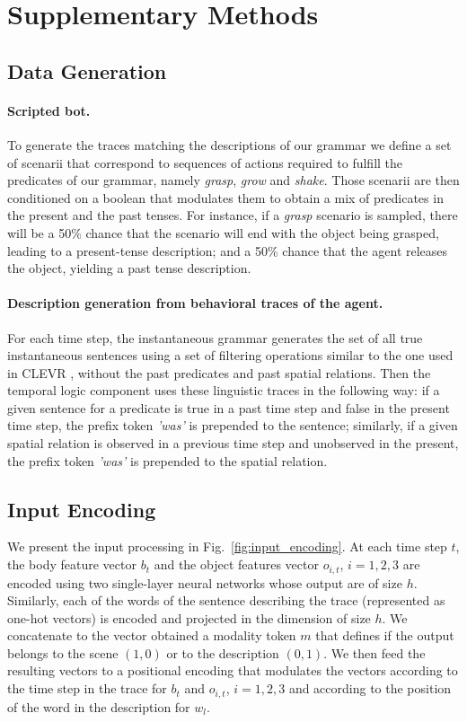 \newpage
\section{Supplementary Methods}

\subsection{Data Generation} \label{sup:data_gen}
\paragraph{Scripted bot.} To generate the traces matching the descriptions of our grammar we define a set of scenarii that correspond to sequences of actions required to fulfill the predicates of our grammar, namely \textit{grasp}, \textit{grow} and \textit{shake}. Those scenarii are then conditioned on a boolean that modulates them to obtain a mix of predicates in the present and the past tenses. For instance, if a \textit{grasp} scenario is sampled, there will be a 50\% chance that the scenario will end with the object being grasped, leading to a present-tense description; and a 50\% chance that the agent releases the object, yielding a past tense description.

\paragraph{Description generation from behavioral traces of the agent.} For each time step, the instantaneous grammar generates the set of all true instantaneous sentences using a set of filtering operations similar to the one used in CLEVR \cite{johnson2016clevr}, without the past predicates and past spatial relations. Then the temporal logic component uses these linguistic traces in the following way: if a given sentence for a predicate is true in a past time step and false in the present time step, the prefix token \textit{'was'} is prepended to the sentence; similarly, if a given spatial relation is observed in a previous time step and unobserved in the present, the prefix token \textit{'was'} is prepended to the spatial relation.

\subsection{Input Encoding} \label{sup:input_encoding}

We present the input processing in Fig.~\ref{fig:input_encoding}. At each time step $t$, the body feature vector $b_t$ and the object features vector $o_{i,t}$, $i=1,2,3$ are encoded using two single-layer neural networks whose output are of size $h$. Similarly, each of the words of the sentence describing the trace (represented as one-hot vectors) is encoded and projected in the dimension of size $h$.  We concatenate to the vector obtained a modality token $m$ that defines if the output belongs to the scene $(1,0)$ or to the description $(0,1)$. We then feed the resulting vectors to a positional encoding that modulates the vectors according to the time step in the trace for $b_t$ and $o_{i,t}$, $i=1,2,3$ and according to the position of the word in the description for $w_l$. 

